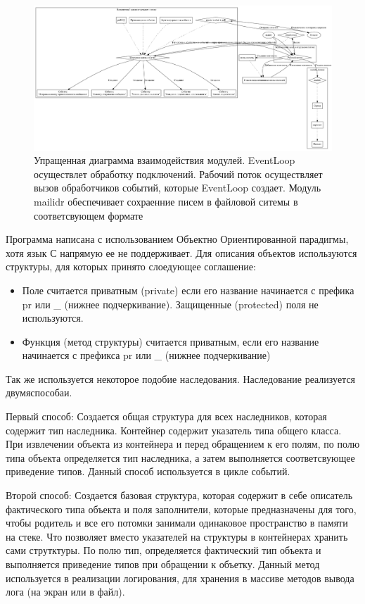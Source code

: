 \documentclass[a4paper,12pt]{report}
\begin{document}
	\begin{figure}[H]
		\centering
		\includegraphics[width=\textwidth]{./resource/logic.png}
		\caption{Упращенная диаграмма взаимодействия модулей. EventLoop осуществлет обработку подключений. Рабочий поток осуществляет вызов обработчиков событий, которые EventLoop создает. Модуль mailidr обеспечивает сохраенние писем в файловой ситемы в соответсвующем формате} \label{fig:ProgLogic}
	\end{figure}

	Программа написана с использованием Объектно Ориентированной парадигмы, хотя язык С напрямую ее не поддерживает. Для описания объектов используются структуры, для которых принято слоедующее соглашение:
	\begin{itemize}
		\item Поле считается приватным (private) если его название начинается с префика pr или \_ (нижнее подчеркивание). Защищенные (protected) поля не используются.
		\item Функция (метод структуры) считается приватным, если его название начинается с префикса pr или \_ (нижнее подчеркивание)
	\end{itemize}
	Так же используется некоторое подобие наследования. Наследование реализуется двумяспособаи.

	 Первый способ: Создается общая структура для всех наследников, которая содержит тип наследника. Контейнер содержит указатель типа общего класса. При извлечении объекта из контейнера и перед обращением к его полям, по полю типа объекта определяется тип наследника, а затем выполняется соответсвующее приведение типов. Данный способ используется в цикле событий.

	 Второй способ: Создается базовая структура, которая содержит в себе описатель фактического типа объекта и поля заполнители, которые предназначены для того, чтобы родитель и все его потомки занимали одинаковое пространство в памяти на стеке. Что позволяет вместо указателей на структуры в контейнерах хранить сами струтктуры. По полю тип, определяется фактический тип объекта и выполняется приведение типов при обращении к объетку. Данный метод используется в реализации логирования, для хранения в массиве методов вывода лога (на экран или в файл).
\end{document}

